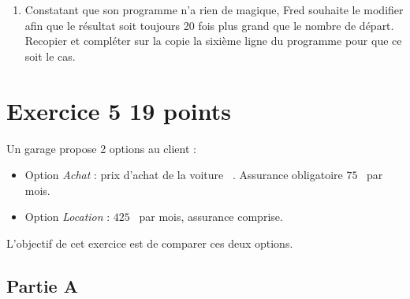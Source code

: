 \documentclass[11pt]{article}
\newcommand{\euro}{\eurologo{}}
\begin{document}
\begin{scratch}[scale=0.8,baseline=4]
\end{scratch}
	\hfill
	\begin{minipage}{0.6\linewidth}
		\begin{enumerate}[start=6]
		\item Constatant que son programme n'a rien de magique, Fred souhaite le modifier afin que le résultat soit toujours 20 fois plus grand que le nombre de départ. Recopier et compléter sur la copie la sixième ligne du programme pour que ce soit le cas.
	\end{enumerate}
	\end{minipage}

\bigskip

\section*{Exercice 5 \hfill 19 points}

Un garage propose 2 options au client :

\begin{itemize}[label=\textbullet]
\item Option \emph{Achat} : prix d'achat de la voiture ~\euro{}. Assurance obligatoire $75 $~\euro{} par mois.
\item Option \emph{Location} : $425 $~\euro{} par mois, assurance comprise.
\end{itemize}

L'objectif de cet exercice est de comparer ces deux options.

\subsection*{Partie A}
\end{document}
